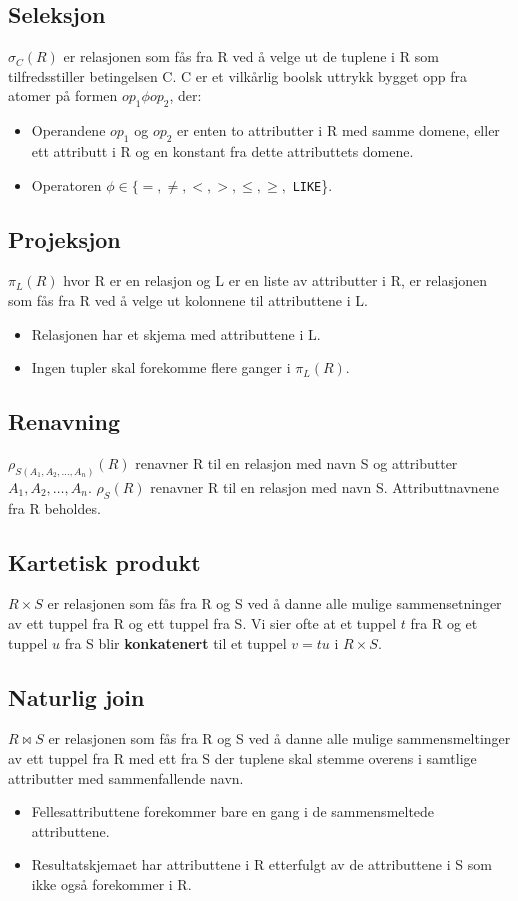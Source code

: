 \documentclass[12pt,a4paper]{article}
\begin{document}
\subsection{Seleksjon}
$\sigma_C(R)$ er relasjonen som fås fra R ved å velge ut de tuplene i R som tilfredsstiller betingelsen C. C er et vilkårlig boolsk uttrykk bygget opp fra atomer på formen $op_1 \phi op_2$, der:
\begin{itemize}
\item{Operandene $op_1$ og $op_2$ er enten to attributter i R med samme domene, eller ett attributt i R og en konstant fra dette attributtets domene.}
\item{Operatoren $\phi \in \{=, \neq, <, >, \leq, \geq,$ \texttt{LIKE}\}.}
\end{itemize}

\subsection{Projeksjon}
$\pi_L(R)$ hvor R er en relasjon og L er en liste av attributter i R, er relasjonen som fås fra R ved å velge ut kolonnene til attributtene i L.
\begin{itemize}
\item{Relasjonen har et skjema med attributtene i L.}
\item{Ingen tupler skal forekomme flere ganger i $\pi_L(R)$.}
\end{itemize}

\subsection{Renavning}
$\rho_{S(A_1, A_2, \dots, A_n)}(R)$ renavner R til en relasjon med navn S og attributter $A_1, A_2, \dots, A_n$.
$\rho_S(R)$ renavner R til en relasjon med navn S. Attributtnavnene fra R beholdes.

\subsection{Kartetisk produkt}
$R \times S$ er relasjonen som fås fra R og S ved å danne alle mulige sammensetninger av ett tuppel fra R og ett tuppel fra S. Vi sier ofte at et tuppel $t$ fra R og et tuppel $u$ fra S blir \textbf{konkatenert} til et tuppel $v = tu$ i $R \times S$.

\subsection{Naturlig join}
$R \bowtie S$ er relasjonen som fås fra R og S ved å danne alle mulige sammensmeltinger av ett tuppel fra R med ett fra S der tuplene skal stemme overens i samtlige attributter med sammenfallende navn.
\begin{itemize}
\item{Fellesattributtene forekommer bare en gang i de sammensmeltede attributtene.}
\item{Resultatskjemaet har attributtene i R etterfulgt av de attributtene i S som ikke også forekommer i R.}
\end{itemize}
\end{document}
